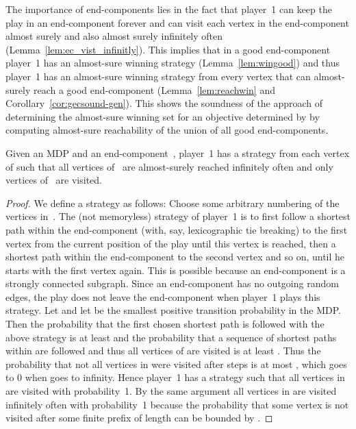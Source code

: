 \documentclass[11pt,letterpaper]{article}
\begin{document}
The importance of end-components lies in the fact that player~1 can keep the play
in an end-component forever and can visit each vertex in the end-component
almost surely and also almost surely infinitely often
(Lemma~\ref{lem:ec_vist_infinitly}). This implies that in a good end-component
player~1 has an almost-sure winning strategy (Lemma~\ref{lem:wingood}) and thus
player~1 has an almost-sure winning strategy from every vertex that can 
almost-surely reach a good end-component (Lemma~\ref{lem:reachwin} and 
Corollary~\ref{cor:gecsound-gen}). This shows the soundness of the approach
of determining the almost-sure winning set for an objective determined by 
 by computing almost-sure reachability of the union of all good
end-components.

\begin{lemma}\label{lem:ec_vist_infinitly}
  Given an MDP  and an end-component~, player~1 has a strategy
  from each vertex of  such that all vertices of~ are 
  almost-surely reached infinitely often
  and only vertices of~ are visited. 
\end{lemma}
\begin{proof}
  We define a strategy  as follows: 
  Choose some arbitrary numbering of the vertices in~. The (not memoryless)
  strategy of player~1 is to first follow a shortest path within the end-component
  (with, say, lexicographic tie breaking) to the first vertex from the current 
  position of the play until this vertex is reached, then a shortest path 
  within the end-component to the 
  second vertex and so on, until he starts with the first vertex again. This is
  possible because an end-component is a strongly connected subgraph. 
  Since an end-component has no outgoing random edges, the 
  play does not leave the end-component when player~1 plays this strategy.
  Let  and let  be the smallest
  positive transition probability in the MDP. Then the probability that the first 
  chosen shortest path is followed with the above strategy 
  is at least  and the 
  probability that a sequence of  shortest paths within  are followed 
  and thus all vertices of  are visited is at least . Thus 
  the probability that not all 
  vertices in  were visited after  steps is at most , which goes to 0 when  goes to infinity. Hence player~1
  has a strategy such that all vertices in  are visited with probability~1.
  By the same argument all vertices in  are visited infinitely often with 
  probability~1 because the probability that some vertex is not visited after 
  some finite prefix of length  can be bounded by .
\end{proof}
\end{document}
